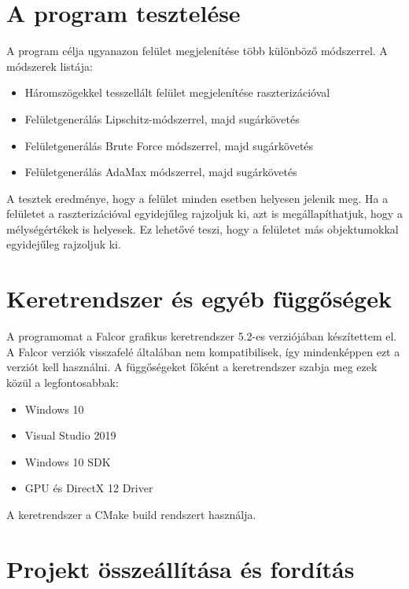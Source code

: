 \section{A program tesztelése}

A program célja ugyanazon felület megjelenítése több különböző módszerrel. A módszerek listája: 
\begin{itemize}
	\item Háromszögekkel tesszellált felület megjelenítése raszterizációval
	\item Felületgenerálás Lipschitz-módszerrel, majd sugárkövetés
	\item Felületgenerálás Brute Force módszerrel, majd sugárkövetés
	\item Felületgenerálás AdaMax módszerrel, majd sugárkövetés
\end{itemize}
A tesztek eredménye, hogy a felület minden esetben helyesen jelenik meg. Ha a felületet a raszterizációval egyidejűleg rajzoljuk ki, azt is megállapíthatjuk, hogy a mélységértékek is helyesek. Ez lehetővé teszi, hogy a felületet más objektumokkal egyidejűleg rajzoljuk ki.


\section{Keretrendszer és egyéb függőségek}

A programomat a Falcor \cite{Kallweit22} grafikus keretrendszer 5.2-es verziójában készítettem el. A Falcor verziók visszafelé általában nem kompatibilisek, így mindenképpen ezt a verziót kell használni. A függőségeket főként a keretrendszer szabja meg ezek közül a legfontosabbak:

\begin{itemize}
	\item Windows 10
	\item Visual Studio 2019
	\item Windows 10 SDK
	\item GPU és DirectX 12 Driver
\end{itemize}

A keretrendszer a CMake build rendszert használja.

\section{Projekt összeállítása és fordítás}

